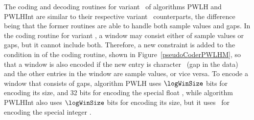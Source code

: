 The coding and decoding routines for variant \NOmaskalgo\ of algorithms PWLH and PWLHInt are similar to their respective variant \maskalgo\ counterparts, the difference being that the former routines are able to handle both sample values and gaps. In the coding routine for variant \NOmaskalgo, a window may consist either of sample values or gaps, but it cannot include both. Therefore, a new constraint is added to the condition in  of the coding routine, shown in Figure~\ref{pseudoCoderPWLHM}, so that a window is also encoded if the new entry is character \noData\ (gap in the data) and the other entries in the window are sample values, or vice versa. To encode a window that consists of gaps, algorithm PWLH uses $\logWinSize$ bits for encoding its size, and 32 bits for encoding the special float \nodatafloat, while algorithm PWLHInt also uses $\logWinSize$ bits for encoding its size, but it uses \tobitexp\ for encoding the special integer \nodata.

